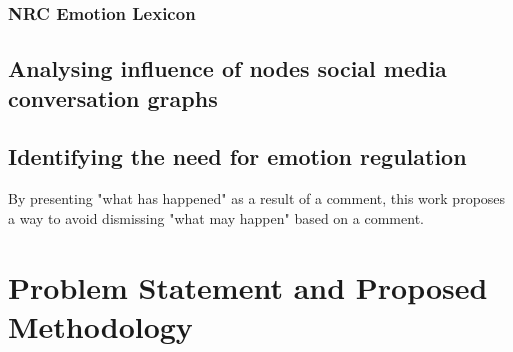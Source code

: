 \documentclass[acmtog]{acmart}
\begin{document}
\subsubsection{NRC Emotion Lexicon}
\subsection{Analysing influence of nodes social media conversation graphs}

\subsection{Identifying the need for emotion regulation}
By presenting "what has happened" as a result of a comment, this work proposes a way to avoid dismissing "what may happen" based on a comment.



\section{Problem Statement and Proposed Methodology}
\end{document}
